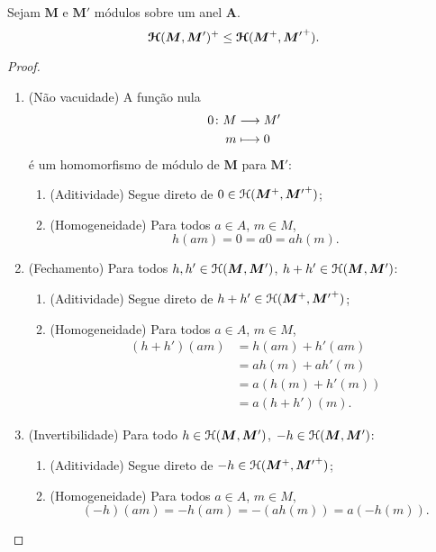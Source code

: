 \begin{proposition}
\label{prop:mod.subgrupo}
Sejam $\bm M$ e $\bm M'$ módulos sobre um anel $\bm A$.
	\begin{equation*}
	\bm{\mathcal{H}}(\bm M,\bm M')^+ \leq \bm{\mathcal{H}}(\bm M^+,{\bm M'}^+).
	\end{equation*}
\end{proposition}
\begin{proof}
	\begin{enumerate}
	\item (Não vacuidade) A função nula
		\begin{align*}
		\func{0}{M}{M'}{m}{0}
		\end{align*}
	é um homomorfismo de módulo de $\bm M$ para $\bm M'$:
		\begin{enumerate}
		\item (Aditividade) Segue direto de $0 \in \mathcal{H}(\bm M^+,{\bm M'}^+)$;
		\item (Homogeneidade) Para todos $a \in A$, $m \in M$,
			\begin{equation*}
			h(a m) = 0 = a0 = ah(m).
			\end{equation*}
		\end{enumerate}
	
	\item (Fechamento) Para todos $h,h' \in \mathcal{H}(\bm M,\bm M')$, $h+h' \in \mathcal{H}(\bm M,\bm M')$:
		\begin{enumerate}
		\item (Aditividade) Segue direto de $h+h' \in  \mathcal{H}(\bm M^+,{\bm M'}^+)$;
		\item (Homogeneidade) Para todos $a \in A$, $m \in M$,
			\begin{align*}
			(h+h')(am) &= h(am) + h'(am) \\
				&= ah(m) + ah'(m) \\
				&= a(h(m) + h'(m)) \\
				&= a(h+h')(m).
			\end{align*}
		\end{enumerate}
	
	\item (Invertibilidade) Para todo $h \in \mathcal{H}(\bm M,\bm M')$, $-h \in \mathcal{H}(\bm M,\bm M')$:
		\begin{enumerate}
		\item (Aditividade) Segue direto de $-h \in  \mathcal{H}(\bm M^+,{\bm M'}^+)$;
		\item (Homogeneidade) Para todos $a \in A$, $m \in M$,
			\begin{equation*}
			(-h)(am) = -h(am) = -(ah(m)) = a(-h(m)).
			\end{equation*}
		\end{enumerate}
	\end{enumerate}
\end{proof}

